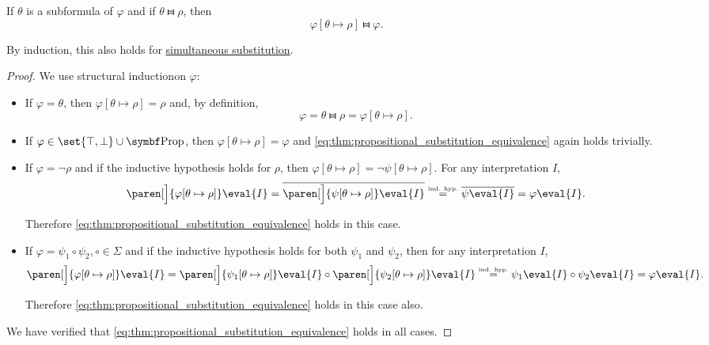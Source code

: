 \begin{proposition}\label{thm:propositional_substitution_equivalence}
  If \( \theta \) is a subformula of \( \varphi \) and if \( \theta \gleichstark \rho \), then
  \begin{equation}\label{eq:thm:propositional_substitution_equivalence}
    \varphi[\theta \mapsto \rho] \gleichstark \varphi.
  \end{equation}

  By induction, this also holds for \hyperref[def:propositional_substitution/simultaneous]{simultaneous substitution}.
\end{proposition}
\begin{proof}
  We use structural induction\IND on \( \varphi \):

  \begin{itemize}
    \item If \( \varphi = \theta \), then \( \varphi[\theta \mapsto \rho] = \rho \) and, by definition,
    \begin{equation*}
      \varphi = \theta \gleichstark \rho = \varphi[\theta \mapsto \rho].
    \end{equation*}

    \item If \( \varphi \in \set{ \top, \bot } \cup \bfop{Prop} \), then \( \varphi[\theta \mapsto \rho] = \varphi \) and \eqref{eq:thm:propositional_substitution_equivalence} again holds trivially.

    \item If \( \varphi = \neg \rho \) and if the inductive hypothesis holds for \( \rho \), then \( \varphi[\theta \mapsto \rho] = \neg \psi[\theta \mapsto \rho] \). For any interpretation \( I \),
    \begin{equation*}
      \paren[\Big]{ \varphi[\theta \mapsto \rho] }\eval{I}
      =
      \overline{\paren[\Big]{ \psi[\theta \mapsto \rho] }\eval{I}}
      \overset {\IndHyp} =
      \overline{\psi\eval{I}}
      =
      \varphi\eval{I}.
    \end{equation*}

    Therefore \eqref{eq:thm:propositional_substitution_equivalence} holds in this case.

    \item If \( \varphi = \psi_1 \circ \psi_2, \circ \in \Sigma \) and if the inductive hypothesis holds for both \( \psi_1 \) and \( \psi_2 \), then for any interpretation \( I \),
    \begin{equation*}
      \paren[\Big]{ \varphi[\theta \mapsto \rho] }\eval{I}
      =
      \paren[\Big]{ \psi_1[\theta \mapsto \rho] }\eval{I} \circ \paren[\Big]{ \psi_2[\theta \mapsto \rho] }\eval{I}
      \overset {\IndHyp} =
      \psi_1\eval{I} \circ \psi_2\eval{I}
      =
      \varphi\eval{I}.
    \end{equation*}

    Therefore \eqref{eq:thm:propositional_substitution_equivalence} holds in this case also.
  \end{itemize}

  We have verified that \eqref{eq:thm:propositional_substitution_equivalence} holds in all cases.
\end{proof}

